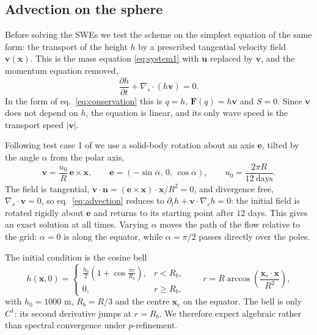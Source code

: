 \subsection{Advection on the sphere}\label{sec:sph-advection}
Before solving the SWEs we test the scheme on the simplest equation of the same form: the transport of the height $h$ by a prescribed tangential velocity field $\mathbf{v}(\mathbf{x})$. This is the mass equation \eqref{eq:system1} with $\mathbf{u}$ replaced by $\mathbf{v}$, and the momentum equation removed,
\begin{equation}\label{eq:advection}
    \frac{\partial h}{\partial t} + \nabla_s\cdot(h\mathbf{v}) = 0 .
\end{equation}
In the form of eq.~\eqref{eq:conservation} this is $q = h$, $\mathbf{F}(q) = h\mathbf{v}$ and $S = 0$. Since $\mathbf{v}$ does not depend on $h$, the equation is linear, and its only wave speed is the transport speed $|\mathbf{v}|$.

Following test case 1 of \cite{williamson1992standard} we use a solid-body rotation about an axis $\mathbf{e}$, tilted by the angle $\alpha$ from the polar axis,
\begin{equation}\label{eq:sbr}
    \mathbf{v} = \frac{u_0}{R}\,\mathbf{e}\times\mathbf{x}, \qquad
    \mathbf{e} = (-\sin\alpha,\, 0,\, \cos\alpha), \qquad
    u_0 = \frac{2\pi R}{12\ \text{days}} .
\end{equation}
The field is tangential, $\mathbf{v}\cdot\mathbf{n} = (\mathbf{e}\times\mathbf{x})\cdot\mathbf{x}/R^2 = 0$, and divergence free, $\nabla_s\cdot\mathbf{v} = 0$, so eq.~\eqref{eq:advection} reduces to $\partial_t h + \mathbf{v}\cdot\nabla_s h = 0$: the initial field is rotated rigidly about $\mathbf{e}$ and returns to its starting point after $12$ days. This gives an exact solution at all times. Varying $\alpha$ moves the path of the flow relative to the grid: $\alpha = 0$ is along the equator, while $\alpha = \pi/2$ passes directly over the poles.

The initial condition is the cosine bell
\begin{equation}\label{eq:cosinebell}
    h(\mathbf{x},0) =
    \begin{cases}
        \frac{h_0}{2}\left(1 + \cos\frac{\pi r}{R_b}\right), & r < R_b,\\
        0, & r \geq R_b,
    \end{cases}
    \qquad r = R\arccos\left(\frac{\mathbf{x}_c\cdot\mathbf{x}}{R^2}\right),
\end{equation}
with $h_0 = 1000$ m, $R_b = R/3$ and the centre $\mathbf{x}_c$ on the equator. The bell is only $C^1$: its second derivative jumps at $r = R_b$. We therefore expect algebraic rather than spectral convergence under $p$-refinement.

